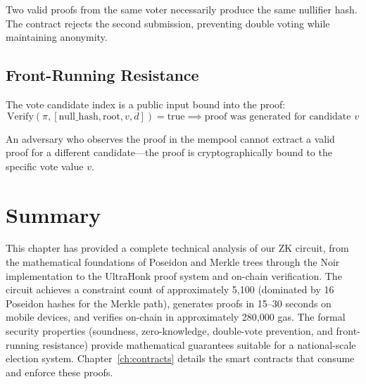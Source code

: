 Two valid proofs from the same voter necessarily produce the same nullifier hash. The contract rejects the second submission, preventing double voting while maintaining anonymity.

\subsection{Front-Running Resistance}

The vote candidate index is a public input bound into the proof:
\begin{equation}
\text{Verify}(\pi, [\text{null\_hash}, \text{root}, v, d]) = \text{true} \implies \text{proof was generated for candidate } v
\end{equation}

An adversary who observes the proof in the mempool cannot extract a valid proof for a different candidate---the proof is cryptographically bound to the specific vote value $v$.

\section{Summary}

This chapter has provided a complete technical analysis of our ZK circuit, from the mathematical foundations of Poseidon and Merkle trees through the Noir implementation to the UltraHonk proof system and on-chain verification. The circuit achieves a constraint count of approximately 5,100 (dominated by 16 Poseidon hashes for the Merkle path), generates proofs in 15--30 seconds on mobile devices, and verifies on-chain in approximately 280,000 gas. The formal security properties (soundness, zero-knowledge, double-vote prevention, and front-running resistance) provide mathematical guarantees suitable for a national-scale election system. Chapter~\ref{ch:contracts} details the smart contracts that consume and enforce these proofs.
